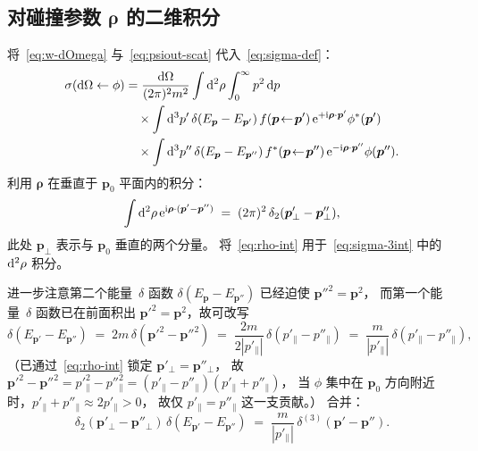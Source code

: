 \subsection{对碰撞参数 $\bm{\rho}$ 的二维积分}

将~\eqref{eq:w-dOmega} 与~\eqref{eq:psiout-scat} 代入~\eqref{eq:sigma-def}：
\begin{align}
\sigma(\mathrm{d}\Omega \leftarrow \phi)
&= \frac{\mathrm{d}\Omega}{(2\pi)^2 m^2}
\int \mathrm{d}^2\rho \int_0^\infty p^2\,\mathrm{d} p \nonumber\\
&\quad \times \int \mathrm{d}^3 p'\,\delta(E_{\bm{p}}-E_{\bm{p}'})\,f(\bm{p}\!\leftarrow\!\bm{p}')\,
\mathrm{e}^{+\mathrm{i}\bm{\rho}\cdot\bm{p}'}\phi^*(\bm{p}') \nonumber\\
&\quad \times \int \mathrm{d}^3 p''\,\delta(E_{\bm{p}}-E_{\bm{p}''})\,f^*(\bm{p}\!\leftarrow\!\bm{p}'')\,
\mathrm{e}^{-\mathrm{i}\bm{\rho}\cdot\bm{p}''}\phi(\bm{p}'').
\label{eq:sigma-3int}
\end{align}
利用 $\bm{\rho}$ 在垂直于 $\bm{p}_0$ 平面内的积分：
\begin{equation}
\int \mathrm{d}^2\rho\,\mathrm{e}^{\mathrm{i}\bm{\rho}\cdot(\bm{p}'-\bm{p}'')} \;=\; (2\pi)^2\,\delta_2(\bm{p}'_\perp - \bm{p}''_\perp),
\label{eq:rho-int}
\end{equation}
此处 $\bm{p}_\perp$ 表示与 $\bm{p}_0$ 垂直的两个分量。
将~\eqref{eq:rho-int} 用于~\eqref{eq:sigma-3int} 中的 $\mathrm{d}^2\rho$ 积分。

进一步注意第二个能量~$\delta$ 函数 $\delta(E_{\bm{p}}-E_{\bm{p}''})$ 已经迫使 $\bm{p}''^2 = \bm{p}^2$，
而第一个能量~$\delta$ 函数已在前面积出 $\bm{p}'^2 = \bm{p}^2$，故可改写
\begin{equation}
\delta(E_{\bm{p}'}-E_{\bm{p}''}) \;=\; 2m\,\delta(\bm{p}'^2-\bm{p}''^2)
\;=\; \frac{2m}{2|p'_\parallel|}\,\delta(p'_\parallel - p''_\parallel)
\;=\; \frac{m}{|p'_\parallel|}\,\delta(p'_\parallel - p''_\parallel),
\end{equation}
（已通过~\eqref{eq:rho-int} 锁定 $\bm{p}'_\perp = \bm{p}''_\perp$，
故 $\bm{p}'^2 - \bm{p}''^2 = p'^2_\parallel - p''^2_\parallel = (p'_\parallel - p''_\parallel)(p'_\parallel + p''_\parallel)$，
当 $\phi$ 集中在 $\bm{p}_0$ 方向附近时，$p'_\parallel + p''_\parallel \approx 2 p'_\parallel > 0$，
故仅 $p'_\parallel = p''_\parallel$ 这一支贡献。）
合并：
\begin{equation}
\delta_2(\bm{p}'_\perp - \bm{p}''_\perp)\,\delta(E_{\bm{p}'} - E_{\bm{p}''})
\;=\; \frac{m}{|p'_\parallel|}\,\delta^{(3)}(\bm{p}' - \bm{p}'').
\label{eq:two-delta-merge}
\end{equation}

